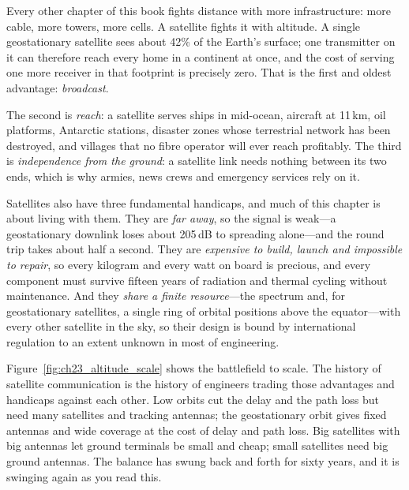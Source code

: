 Every other chapter of this book fights distance with more infrastructure: more cable, more
towers, more cells. A satellite fights it with altitude. A single geostationary satellite sees
about 42\% of the Earth's surface; one transmitter on it can therefore reach every home in a
continent at once, and the cost of serving one more receiver in that footprint is precisely zero.
That is the first and oldest advantage: \emph{broadcast}.

The second is \emph{reach}: a satellite serves ships in mid-ocean, aircraft at 11\,km, oil
platforms, Antarctic stations, disaster zones whose terrestrial network has been destroyed, and
villages that no fibre operator will ever reach profitably. The third is \emph{independence from
the ground}: a satellite link needs nothing between its two ends, which is why armies, news crews
and emergency services rely on it.


Satellites also have three fundamental handicaps, and much of this chapter is about living with
them. They are \emph{far away}, so the signal is weak---a geostationary downlink loses about
205\,dB to spreading alone---and the round trip takes about half a second. They are
\emph{expensive to build, launch and impossible to repair}, so every kilogram and every watt on
board is precious, and every component must survive fifteen years of radiation and thermal cycling
without maintenance. And they \emph{share a finite resource}---the spectrum and, for geostationary
satellites, a single ring of orbital positions above the equator---with every other satellite in
the sky, so their design is bound by international regulation to an extent unknown in most of
engineering.

Figure~\ref{fig:ch23_altitude_scale} shows the battlefield to scale. The history of satellite
communication is the history of engineers trading those advantages and handicaps against each
other. Low orbits cut the delay and the path loss but need many satellites and tracking antennas;
the geostationary orbit gives fixed antennas and wide coverage at the cost of delay and path loss.
Big satellites with big antennas let ground terminals be small and cheap; small satellites need big
ground antennas. The balance has swung back and forth for sixty years, and it is swinging again as
you read this.

